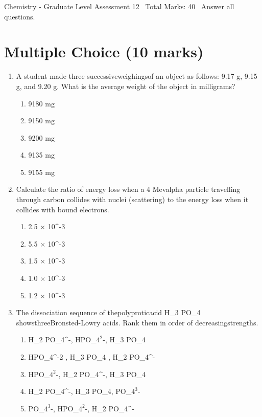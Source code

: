 \documentclass[12pt]{article}
\begin{document}
\begin{center}
Chemistry - Graduate Level Assessment 12 \
Total Marks: 40 \
Answer all questions.
\end{center}

\section*{Multiple Choice (10 marks)}
\begin{enumerate}[label=\arabic*.]
\item A student made three successiveweighingsof an object as follows: 9.17 g, 9.15 g, and 9.20 g. What is the average weight of the object in milligrams?
\begin{enumerate}[label=(\alph*)]
    \item 9180 mg
    \item 9150 mg
    \item 9200 mg
    \item 9135 mg
    \item 9155 mg
\end{enumerate}
\item Calculate the ratio of energy loss when a 4 Mevalpha particle travelling through carbon collides with nuclei (scattering) to the energy loss when it collides with bound electrons.
\begin{enumerate}[label=(\alph*)]
    \item 2.5 \ensuremath{\times} 10^-3
    \item 5.5 \ensuremath{\times} 10^-3
    \item 1.5 \ensuremath{\times} 10^-3
    \item 1.0 \ensuremath{\times} 10^-3
    \item 1.2 \ensuremath{\times} 10^-3
\end{enumerate}
\item The dissociation sequence of thepolyproticacid H\_3 PO\_4 showsthreeBronsted-Lowry acids. Rank them in order of decreasingstrengths.
\begin{enumerate}[label=(\alph*)]
    \item H\_2 PO\_4^-, HPO\_$4^2$-, H\_3 PO\_4
    \item HPO\_4^-2 , H\_3 PO\_4 , H\_2 PO\_4^-
    \item HPO\_$4^2$-, H\_2 PO\_4^-, H\_3 PO\_4
    \item H\_2 PO\_4^-, H\_3 PO\_4, PO\_$4^3$-
    \item PO\_$4^3$-, HPO\_$4^2$-, H\_2 PO\_4^-
\end{enumerate}

\end{enumerate}
\end{document}
